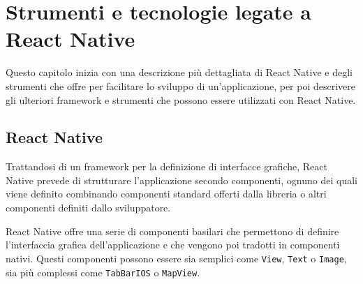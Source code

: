 
\chapter{Strumenti e tecnologie legate a React Native}
\label{cap:strumenti-tecnologie}


Questo capitolo inizia con una descrizione più dettagliata di React Native e degli strumenti che offre per facilitare lo sviluppo di un'applicazione, per poi descrivere gli ulteriori framework e strumenti che possono essere utilizzati con React Native.

\section{React Native}

Trattandosi di un framework per la definizione di interfacce grafiche, React Native prevede di strutturare l'applicazione secondo componenti, ognuno dei quali viene definito combinando componenti standard offerti dalla libreria o altri componenti definiti dallo sviluppatore.

React Native offre una serie di componenti basilari che permettono di definire l'interfaccia grafica dell'applicazione e che vengono poi tradotti in componenti nativi. Questi componenti possono essere sia semplici come \texttt{View}, \texttt{Text} o \texttt{Image}, sia più complessi come \texttt{TabBarIOS} o \texttt{MapView}.


